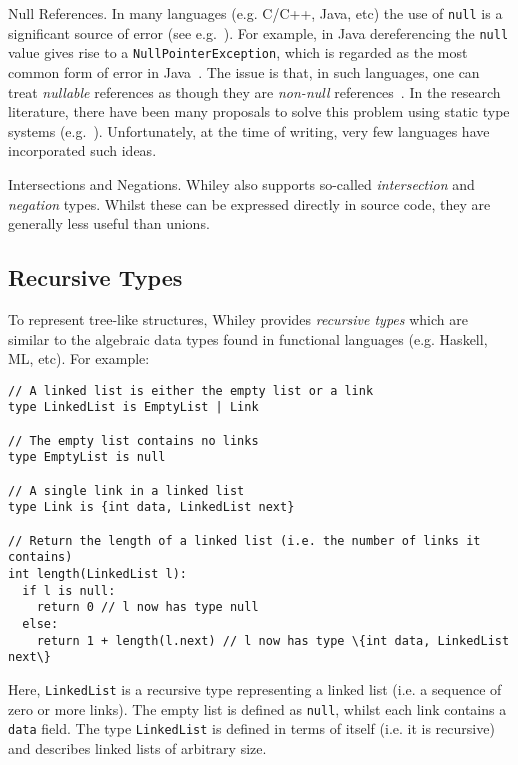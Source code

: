 \begin{insight}{Null References.}  In many languages (e.g. C/C++,
  Java, etc) the use of \lstinline{null} is a significant source of
  error (see e.g.~\cite{Hoa09}).  For example, in Java dereferencing
  the \lstinline{null} value gives rise to a
  \lstinline{NullPointerException}, which is regarded as the most
  common form of error in Java~\cite{XYZ}.  The issue is that, in such
  languages, one can treat {\em nullable} references as though they
  are {\em non-null} references~\cite{Pier02}.  In the research
  literature, there have been many proposals to solve this problem
  using static type systems
  (e.g.~\cite{PQVHV01,FL03,KH07,CFJJ06,CJ07,MPPD08,Hub08,HJP08}).
  Unfortunately, at the time of writing, very few languages have
  incorporated such ideas.
\end{insight}

\begin{insight}{Intersections and Negations.}
  Whiley also supports so-called {\em intersection} and {\em negation}
  types.  Whilst these can be expressed directly in source code, they
  are generally less useful than unions.
\end{insight}


\subsection{Recursive Types}
To represent tree-like structures, Whiley provides {\em recursive
  types} which are similar to the algebraic data types found in
functional languages (e.g. Haskell, ML, etc).  For example:
\begin{lstlisting}
// A linked list is either the empty list or a link
type LinkedList is EmptyList | Link

// The empty list contains no links
type EmptyList is null

// A single link in a linked list
type Link is {int data, LinkedList next}

// Return the length of a linked list (i.e. the number of links it contains)
int length(LinkedList l):
  if l is null:    
    return 0 // l now has type null
  else:    
    return 1 + length(l.next) // l now has type \{int data, LinkedList next\}
\end{lstlisting}
Here, \lstinline{LinkedList} is a recursive type representing a linked
list (i.e. a sequence of zero or more links).  The empty list is
defined as \lstinline{null}, whilst each link contains a
\lstinline{data} field.  The type \lstinline{LinkedList} is defined in
terms of itself (i.e. it is recursive) and describes linked lists of
arbitrary size.

